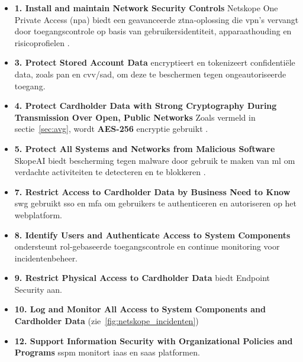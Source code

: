 {\small
  \begin{itemize}
    \item \textbf{1. Install and maintain Network Security Controls}  
          Netskope One Private Access (\gls{npa}) biedt een geavanceerde \gls{ztna}-oplossing die \gls{vpn}'s vervangt door toegangscontrole op basis van gebruikersidentiteit, apparaathouding en risicoprofielen \autocite{NetskopePrivateAccess2025}. 
    \item \textbf{3. Protect Stored Account Data}  
          \textcite{Netskope2022Encryption, Netskope2025Encryption} encryptieert en tokenizeert confidentiële data, zoals \gls{pan} en \gls{cvv}/\gls{sad}, om deze te beschermen tegen ongeautoriseerde toegang.
    \item \textbf{4. Protect Cardholder Data with Strong Cryptography During Transmission Over Open, Public Networks}  
          Zoals vermeld in sectie~\ref{sec:avg}, wordt \textbf{AES-256} encryptie gebruikt \autocite{Netskope2022Encryption, Netskope2025Encryption}.
    \item \textbf{5. Protect All Systems and Networks from Malicious Software}  
          SkopeAI biedt bescherming tegen malware door gebruik te maken van \gls{ml} om verdachte activiteiten te detecteren en te blokkeren \autocite{Netskope2024PCIDSS}.
    \item \textbf{7. Restrict Access to Cardholder Data by Business Need to Know}  
          \textcite{Netskope2024PCIDSS} \gls{swg} gebruikt \gls{sso} en \gls{mfa} om gebruikers te authenticeren en autoriseren op het webplatform. 
    \item \textbf{8. Identify Users and Authenticate Access to System Components}  
          \textcite{Netskope2024PCIDSS} ondersteunt rol-gebaseerde toegangscontrole en continue monitoring voor incidentenbeheer.
    \item \textbf{9. Restrict Physical Access to Cardholder Data}  
          \textcite{Netskope2025Endpoint} biedt Endpoint Security aan. 
    \item \textbf{10. Log and Monitor All Access to System Components and Cardholder Data}  
          \textcite{Netskope2022SSPM} (zie~\ref{fig:netskope_incidenten})
    \item \textbf{12. Support Information Security with Organizational Policies and Programs} 
          \textcite{Netskope2022SSPM} \gls{sspm} monitort \gls{iaas} en \gls{saas} platformen.
  \end{itemize}
}

\subsection{} %
\label{sec:dora}

